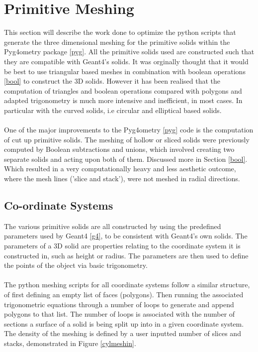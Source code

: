 \documentclass[12pt,a4paper]{article}
\begin{document}
\newpage
\section{Primitive Meshing}
\label{prim}
This section will describe the work done to optimize the python scripts that generate the three dimensional meshing for the primitive solids within the Pyg4ometry package \ref{pyg}. All the primitive solids used are constructed such that they are compatible with Geant4's solids. It was orginally thought that it would be best to use triangular based meshes in combination with boolean operations \ref{bool} to construct the 3D solids. However it has been realised that the computation of triangles and boolean operations compared with polygons and adapted trigonometry is much more intensive and inefficient, in most cases. In particular with the curved solids, i.e circular and elliptical based solids.
\\\\
One of the major improvements to the Pyg4ometry \ref{pyg} code is the computation of cut up primitive solids. The meshing of hollow or sliced solids were previously computed by Boolean subtractions and unions, which involved creating two separate solids and acting upon both of them. Discussed more in Section \ref{bool}. Which resulted in a very computationally heavy and less aesthetic outcome, where the mesh lines ('slice and stack'), were not meshed in radial directions.

\subsection{Co-ordinate Systems}
The various primitive solids are all constructed by using the predefined parameters used by Geant4 \ref{g4}, to be consistent with Geant4's own solids. The parameters of a 3D solid are properties relating to the coordinate system it is constructed in, such as height or radius. The parameters are then used to define the points of the object via basic trigonometry.
\\\\
The python meshing scripts for all coordinate systems follow a similar structure, of first defining an empty list of faces (polygons). Then running the associated trigonometric equations through a number of loops to generate and append polygons to that list. The number of loops is associated with the number of sections a surface of a solid is being split up into in a given coordinate system. The density of the meshing is defined by a user inputted number of slices and stacks, demonstrated in Figure \ref{cylmeshin}.
\end{document}

